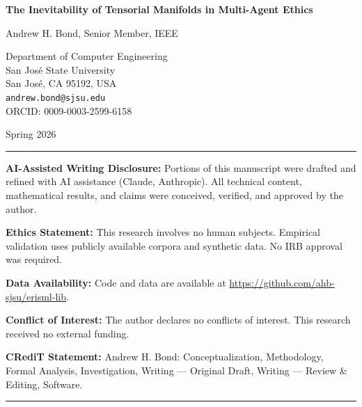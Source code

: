\documentclass[12pt]{article}
\theoremstyle{remark}
\begin{document}
\begin{titlepage}
\centering
\vspace*{2cm}

{\LARGE\bfseries The Inevitability of Tensorial Manifolds in Multi-Agent Ethics}

\vspace{1.5cm}

{\Large Andrew H. Bond, Senior Member, IEEE}

\vspace{0.5cm}

{\large
Department of Computer Engineering\\
San Jos\'e State University\\
San Jos\'e, CA 95192, USA\\[0.3cm]
\texttt{andrew.bond@sjsu.edu}\\[0.3cm]
ORCID: 0009-0003-2599-6158
}

\vspace{1cm}

{\large Spring 2026}

\vspace{2cm}

\begin{abstract}
We provide a topological and algebraic proof that scalar-based ethical
frameworks (e.g., Utilitarianism) are insufficient for systems with non-trivial
symmetries. We demonstrate that for any moral judgment to be invariant under
``Reference Frame Transformations'' (shifts in cultural, individual, or temporal
perspectives), the underlying moral space must be a differentiable manifold
$\mathcal{M}$, and moral obligations must be represented as tensors of rank
$\geq 1$.
\end{abstract}

\vfill

\noindent\rule{\linewidth}{0.4pt}
\small
\noindent\textbf{AI-Assisted Writing Disclosure:} Portions of this manuscript were drafted and refined with AI assistance (Claude, Anthropic). All technical content, mathematical results, and claims were conceived, verified, and approved by the author.

\noindent\textbf{Ethics Statement:} This research involves no human subjects. Empirical validation uses publicly available corpora and synthetic data. No IRB approval was required.

\noindent\textbf{Data Availability:} Code and data are available at \url{https://github.com/ahb-sjsu/erisml-lib}.

\noindent\textbf{Conflict of Interest:} The author declares no conflicts of interest. This research received no external funding.

\noindent\textbf{CRediT Statement:} Andrew H. Bond: Conceptualization, Methodology, Formal Analysis, Investigation, Writing --- Original Draft, Writing --- Review \& Editing, Software.
\noindent\rule{\linewidth}{0.4pt}
\normalsize

\end{titlepage}
\end{document}
